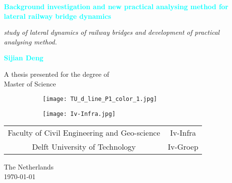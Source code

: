 
\begin{titlepage}
    \begin{center}
        \vspace*{1cm}
        
        \Large{\textbf{\textcolor{cyan}{Background investigation and new practical analysing method for lateral railway bridge dynamics}}}
        

        \normalsize

        \vspace{0.5cm}
        \textit{study of lateral dynamics of railway bridges and development of practical analysing method.}
        


        \vspace{1.5cm}
        
        \textbf{\textcolor{cyan}{Sijian Deng}}
        
        \vfill
        
        A thesis presented for the degree of\\
        Master of Science
        
        \vspace{0.8cm}
        
        \begin{figure}[h]
        \centering
        \begin{subfigure}[b]{0.3\textwidth}
                \texttt{[image: TU\_d\_line\_P1\_color\_1.jpg]}
        \end{subfigure}
        \begin{subfigure}[b]{0.3\textwidth}
                \texttt{[image: Iv-Infra.jpg]}
        \end{subfigure}
        \end{figure}

        \begin{tabular} {cc}
        Faculty of Civil Engineering and Geo-science & Iv-Infra \\
        Delft University of Technology & Iv-Groep\\

        \end{tabular}

        The Netherlands \\
        \today
        
    \end{center}
\end{titlepage}